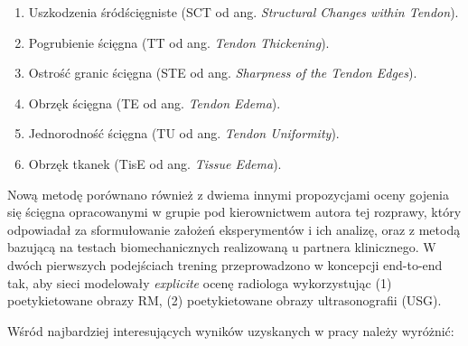 \begin{enumerate}
	\item Uszkodzenia śródścięgniste (SCT od ang. \textit{Structural Changes within Tendon}).
	\item Pogrubienie ścięgna (TT od ang. \textit{Tendon Thickening}).
	\item Ostrość granic ścięgna (STE od ang. \textit{Sharpness of the Tendon Edges}).
	\item Obrzęk ścięgna (TE od ang. \textit{Tendon Edema}).
	\item Jednorodność ścięgna (TU od ang. \textit{Tendon Uniformity}).
	\item Obrzęk tkanek (TisE od ang. \textit{Tissue Edema}).
\end{enumerate}

Nową metodę porównano również z dwiema innymi propozycjami oceny gojenia się ścięgna opracowanymi w grupie pod kierownictwem autora tej rozprawy, który odpowiadał za sformułowanie założeń eksperymentów i ich analizę, oraz z metodą bazującą na testach biomechanicznych realizowaną u partnera klinicznego. W dwóch pierwszych podejściach trening przeprowadzono w koncepcji end-to-end tak, aby sieci modelowały \textit{explicite} ocenę radiologa wykorzystując (1) poetykietowane obrazy RM, (2) poetykietowane obrazy ultrasonografii (USG).

Wśród najbardziej interesujących wyników uzyskanych w pracy należy wyróżnić:

